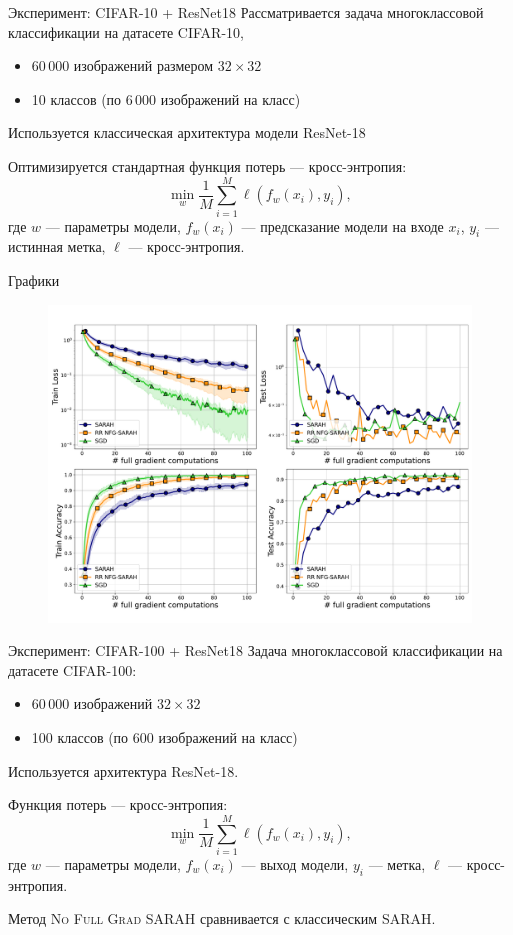 \documentclass{beamer}
\theoremstyle{plain}
\begin{document}
    
\begin{frame}{Эксперимент: CIFAR-10 + ResNet18}
    Рассматривается задача многоклассовой классификации на датасете CIFAR-10, 
    \begin{itemize}
        \item 60\,000 изображений размером $32\times32$
        \item 10 классов (по 6\,000 изображений на класс)
    \end{itemize} 
    
    Используется классическая архитектура модели ResNet-18

    Оптимизируется стандартная функция потерь — кросс-энтропия:
    \[
    \min\limits_{w} \frac{1}{M} \sum_{i=1}^{M} \ell(f_w(x_i), y_i),
    \]
    где $w$ — параметры модели, $f_w(x_i)$ — предсказание модели на входе $x_i$, $y_i$ — истинная метка, $\ell$ — кросс-энтропия.
    \end{frame}
    

\begin{frame}{Графики}
\begin{figure}
\centering    
\includegraphics[width=\linewidth]{../figures/sarah_10.pdf}
\end{figure}
\end{frame}

\begin{frame}{Эксперимент: CIFAR-100 + ResNet18}
    Задача многоклассовой классификации на датасете CIFAR-100:
    \begin{itemize}
        \item 60\,000 изображений $32\times32$
        \item 100 классов (по 600 изображений на класс)
    \end{itemize}

    Используется архитектура ResNet-18.

    Функция потерь — кросс-энтропия:
    \[
    \min\limits_{w} \frac{1}{M} \sum_{i=1}^{M} \ell(f_w(x_i), y_i),
    \]
    где $w$ — параметры модели, $f_w(x_i)$ — выход модели, $y_i$ — метка, $\ell$ — кросс-энтропия.

    Метод \textsc{No Full Grad SARAH} сравнивается с классическим \textsc{SARAH}.
\end{frame}
\end{document}
